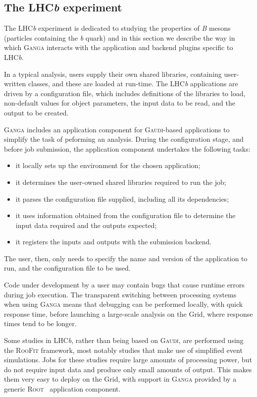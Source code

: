 \documentclass{elsart}
\def\lhcb {LHC{\em b\/}\xspace}
\def\ganga {\textsc{Ganga}\xspace}
\def\root {\textsc{Root}\xspace}
\def\gaudi {\textsc{Gaudi}\xspace}
\def\grid {Grid\xspace}
\def\roofit{\textsc{RooFit}\xspace}
\begin{document}
\subsection{The \lhcb experiment}
\label{sec:lhcb}

The \lhcb experiment is dedicated to studying the properties of \textit{B}
mesons (particles containing the \textit{b} quark) and in this section we
describe the way in which \ganga interacts with the application and
backend plugins specific to \lhcb.

In a typical analysis, users supply their own shared libraries, containing
user-written classes, and these are loaded at run-time. 
The \lhcb applications are driven by a configuration file,
which includes definitions of the libraries to load, non-default values for
object parameters, the input data to be read, and the output to be created.

\ganga includes an application component for \gaudi-based applications to simplify
the task of peforming an analysis. During the configuration stage, and before
job submission, the application component undertakes the following tasks:
\begin{itemize}
\item it locally sets up the environment for the chosen application;
\item it determines the user-owned shared libraries required to
  run the job;
\item it parses the configuration file supplied, including all its dependencies;
\item it uses information obtained from the configuration file to determine
  the input data required and the outputs expected;
\item it registers the inputs and outputs with the submission backend.
\end{itemize}
The user, then, only needs to specify the name and
version of the application to run, and the configuration file to be used.

Code under development by a user may contain bugs that cause
runtime errors during job execution. The transparent switching between
processing systems when using \ganga means that debugging can be
performed locally, with quick response time, before launching a large-scale
analysis on the \grid, where response times tend to be longer.

Some studies in \lhcb, rather than being based on \gaudi, are performed using
the \roofit \cite{RooFit} framework, most notably studies that make use of
simplified event simulations.   Jobs for these studies require large amounts
of processing power, but do not require
input data and produce only small amounts of output. This makes them
very easy to deploy on the \grid, with support in \ganga provided by a
generic \root~\cite{ROOT} application component.
\end{document}
